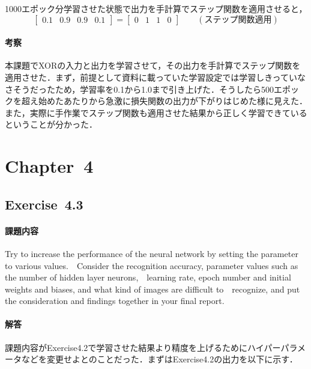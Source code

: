 \documentclass[11pt, a4paper]{jsarticle}
\begin{document}
  1000エポック分学習させた状態で出力を手計算でステップ関数を適用させると，
  \begin{equation*}
    \begin{bmatrix}0.1&0.9&0.9&0.1\end{bmatrix} = \begin{bmatrix}0&1&1&0\end{bmatrix} \qquad (\text{ステップ関数適用})
  \end{equation*}

  \paragraph{ 考察}
  本課題でXORの入力と出力を学習させて，その出力を手計算でステップ関数を適用させた．まず，前提として資料に載っていた学習設定では学習しきっていなさそうだったため，学習率を0.1から1.0まで引き上げた．そうしたら500エポックを超え始めたあたりから急激に損失関数の出力が下がりはじめた様に見えた．また，実際に手作業でステップ関数も適用させた結果から正しく学習できているということが分かった．

  \section{Chapter~4}
  \subsection{Exercise~4.3}
  \paragraph{ 課題内容}
  Try to increase the performance of the neural network by setting the parameter to various values.　Consider the recognition accuracy, parameter values such as the number of hidden layer neurons,　learning rate, epoch number and initial weights and biases, and what kind of images are difficult to　recognize, and put the consideration and findings together in your final report.

  \paragraph{ 解答}
  課題内容がExercise4.2で学習させた結果より精度を上げるためにハイパーパラメータなどを変更せよとのことだった．まずはExercise4.2の出力を以下に示す．
\end{document}
